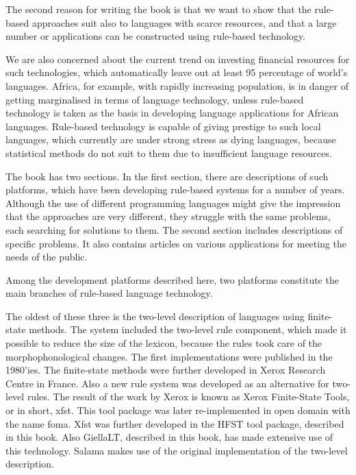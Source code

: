 \documentclass[free]{flammie}
\begin{document}
The second reason for writing the book is that we want to show that the rule-based
approaches suit also to languages with scarce resources, and that a large number or
applications can be constructed using rule-based technology.

We are also concerned about the current trend on investing financial resources for
such technologies, which automatically leave out at least 95 percentage of world’s
languages. Africa, for example, with rapidly increasing population, is in danger of getting
marginalised in terms of language technology, unless rule-based technology is taken as
the basis in developing language applications for African languages.
Rule-based technology is capable of giving prestige to such local languages, which
currently are under strong stress as dying languages, because statistical methods do not
suit to them due to insufficient language resources.

The book has two sections. In the first section, there are descriptions of such
platforms, which have been developing rule-based systems for a number of years.
Although the use of different programming languages might give the impression that the
approaches are very different, they struggle with the same problems, each searching for
solutions to them. The second section includes descriptions of specific problems. It also
contains articles on various applications for meeting the needs of the public.



Among the development platforms described here, two platforms constitute the main
branches of rule-based language technology.

The oldest of these three is the two-level description of languages using finite-state
methods. The system included the two-level rule component, which made it possible to
reduce the size of the lexicon, because the rules took care of the morphophonological
changes. The first implementations were published in the 1980’ies. The finite-state
methods were further developed in Xerox Research Centre in France. Also a new rule
system was developed as an alternative for two-level rules. The result of the work by
Xerox is known as Xerox Finite-State Tools, or in short, xfst. This tool package was later
re-implemented in open domain with the name foma. Xfst was further developed in the
HFST tool package, described in this book. Also GiellaLT, described in this book, has
made extensive use of this technology. Salama makes use of the original implementation
of the two-level description.
\end{document}
